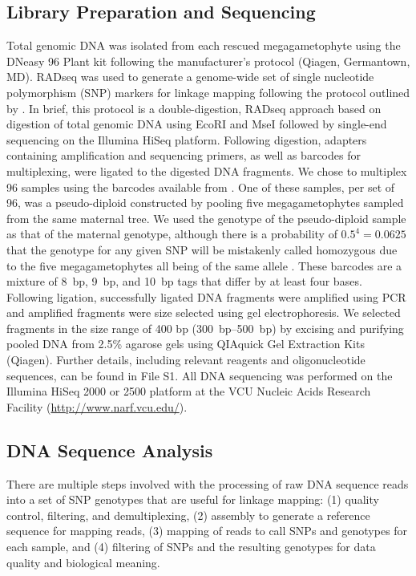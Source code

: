 \documentclass[11pt]{article}
\begin{document}
\subsection*{Library Preparation and Sequencing}
Total genomic DNA was isolated from each rescued megagametophyte using the DNeasy 96 Plant 
kit following the manufacturer’s protocol (Qiagen, Germantown, MD). RADseq \citep{Davey:2010, Parchman:2012, Peterson:2012} 
was used to generate a genome-wide set of 
single nucleotide polymorphism (SNP) markers for linkage mapping following the protocol 
outlined by \citet{Parchman:2012}. In brief, this protocol is a double-digestion, RADseq 
approach based on digestion of total genomic DNA using EcoRI and MseI followed by single-end 
sequencing on the Illumina HiSeq platform. Following digestion, adapters 
containing amplification and sequencing primers, as well as barcodes for multiplexing, 
were ligated to the digested DNA fragments. We chose to multiplex 96 samples using the 
barcodes available from \citet{Parchman:2012}. One of these samples, per set of 96, was a pseudo-diploid
constructed by pooling five megagametophytes sampled from the same maternal tree. We used the genotype of the
pseudo-diploid sample as that of the maternal genotype, although there is a probability of $0.5^{4} = 0.0625$ that 
the genotype for any given SNP will be mistakenly called homozygous due to the five megagametophytes all being of the 
same allele \citep[see][]{Morris:1978}.
These barcodes are a mixture of \SI{8}{bp}, \SI{9}{bp}, and \SI{10}{bp} tags that differ by at least four bases. 
Following ligation, successfully ligated DNA fragments were 
amplified using PCR and amplified fragments were size selected using gel electrophoresis. We selected 
fragments in the size range of 400 bp (\SIrange{300}{500}{bp}) by excising and purifying pooled DNA from 2.5\% 
agarose gels using QIAquick Gel Extraction Kits (Qiagen). Further details, including relevant reagents and 
oligonucleotide sequences, can be found in File S1. All DNA sequencing was performed on the Illumina HiSeq 2000 or 2500
platform at the VCU Nucleic Acids Research Facility (\url{http://www.narf.vcu.edu/}).

\subsection*{DNA Sequence Analysis}\label{ss:dna}
There are multiple steps involved with the processing of raw DNA sequence reads into a set of SNP genotypes that are 
useful for linkage mapping: (1) quality control, filtering, and demultiplexing, (2) assembly to generate a reference 
sequence for mapping reads, (3) mapping of reads to call SNPs and genotypes for each sample, and (4) filtering of SNPs 
and the resulting genotypes for data quality and biological meaning.
\end{document}
